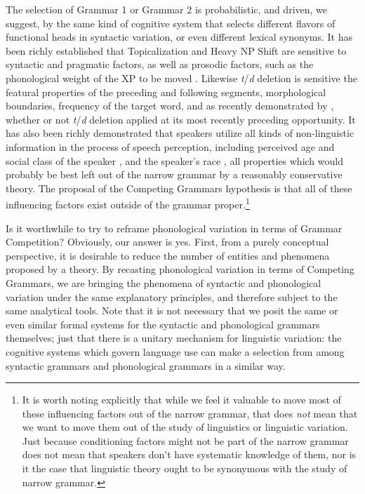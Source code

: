 The selection of Grammar 1 or Grammar 2 is probabilistic, and driven, we suggest, by the same kind of cognitive system that selects different flavors of functional heads in syntactic variation, or even different lexical synonyms.
It has been richly established that Topicalization and Heavy NP Shift are sensitive to syntactic and pragmatic factors, as well as prosodic factors, such as the phonological weight of the XP to be moved \citep[e.g.][]{arnoldetal2000, speyer2008, speyer2010, wallenberg2015}.  %
Likewise {\sl t}/{\sl d} deletion is sensitive the featural properties of the preceding and following segments, morphological boundaries, frequency of the target word, and as recently demonstrated by \citet{MacKenzie.Tamminga2012, tamminga2014}, whether or not {\sl t}/{\sl d} deletion applied at its most recently preceding opportunity. 
It has also been richly demonstrated that speakers utilize all kinds of non-linguistic information in the process of speech perception, including perceived age and social class of the speaker \citep{Hay2006}, and the speaker's race \citep{StaumCasasanto2010}, all properties which would probably be best left out of the narrow grammar by a reasonably conservative theory.
The proposal of the Competing Grammars hypothesis is that all of these influencing factors exist outside of the grammar proper.\footnote{It is worth noting explicitly that while we feel it valuable to move most of these influencing factors out of the narrow grammar, that does \emph{not} mean that we want to move them out of the study of linguistics or linguistic variation. Just because conditioning factors might not be part of the narrow grammar does not mean that speakers don't have systematic knowledge of them, nor is it the case that linguistic theory ought to be synonymous with the study of narrow grammar.}
 
Is it worthwhile to try to reframe phonological variation in terms of Grammar Competition?
Obviously, our answer is yes.
First, from a purely conceptual perspective, it is desirable to reduce the number of entities and phenomena proposed by a theory.
By recasting phonological variation in terms of Competing Grammars, we are bringing the phenomena of syntactic and phonological variation under the same explanatory principles, and therefore subject to the same analytical tools.
Note that it is not necessary that we posit the same or even similar formal systems for the syntactic and phonological grammars themselves; just that there is a unitary mechanism for linguistic variation: the cognitive systems which govern language use can make a selection from among syntactic grammars and phonological grammars in a similar way.


